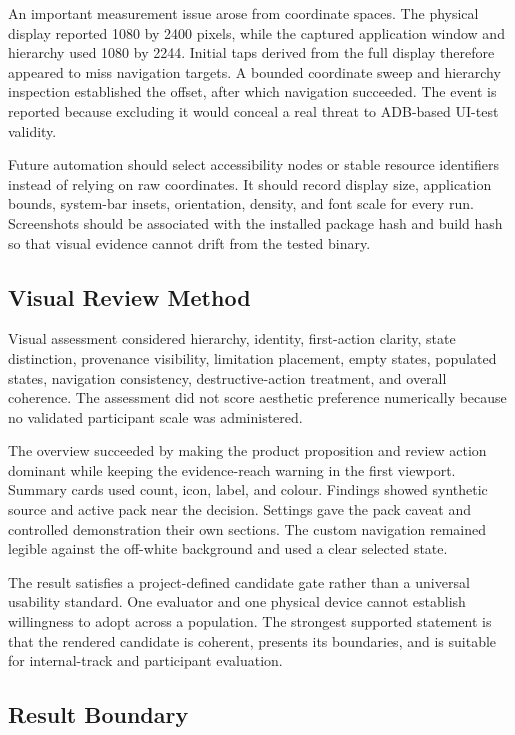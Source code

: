An important measurement issue arose from coordinate spaces. The physical display reported 1080 by 2400 pixels, while the captured application window and hierarchy used 1080 by 2244. Initial taps derived from the full display therefore appeared to miss navigation targets. A bounded coordinate sweep and hierarchy inspection established the offset, after which navigation succeeded. The event is reported because excluding it would conceal a real threat to ADB-based UI-test validity.

Future automation should select accessibility nodes or stable resource identifiers instead of relying on raw coordinates. It should record display size, application bounds, system-bar insets, orientation, density, and font scale for every run. Screenshots should be associated with the installed package hash and build hash so that visual evidence cannot drift from the tested binary.

\subsection{Visual Review Method}

Visual assessment considered hierarchy, identity, first-action clarity, state distinction, provenance visibility, limitation placement, empty states, populated states, navigation consistency, destructive-action treatment, and overall coherence. The assessment did not score aesthetic preference numerically because no validated participant scale was administered.

The overview succeeded by making the product proposition and review action dominant while keeping the evidence-reach warning in the first viewport. Summary cards used count, icon, label, and colour. Findings showed synthetic source and active pack near the decision. Settings gave the pack caveat and controlled demonstration their own sections. The custom navigation remained legible against the off-white background and used a clear selected state.

The result satisfies a project-defined candidate gate rather than a universal usability standard. One evaluator and one physical device cannot establish willingness to adopt across a population. The strongest supported statement is that the rendered candidate is coherent, presents its boundaries, and is suitable for internal-track and participant evaluation.

\subsection{Result Boundary}

